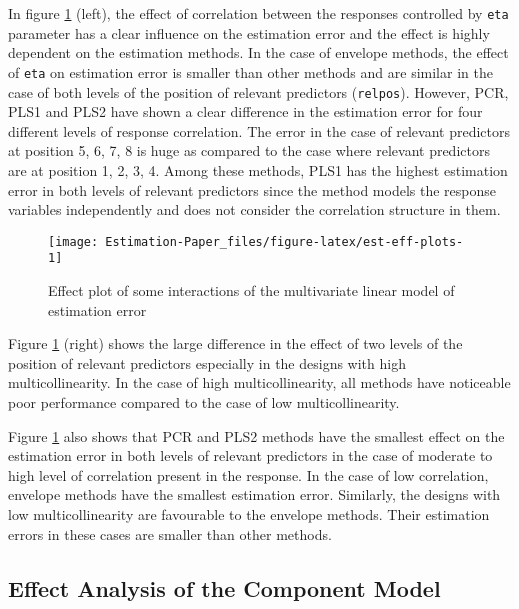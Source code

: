 \documentclass[12pt,3p,authoryear]{elsarticle}
\begin{document}
In figure \ref{fig:est-eff-plots} (left), the effect of correlation
between the responses controlled by \texttt{eta} parameter has a clear
influence on the estimation error and the effect is highly dependent on
the estimation methods. In the case of envelope methods, the effect of
\texttt{eta} on estimation error is smaller than other methods and are
similar in the case of both levels of the position of relevant
predictors (\texttt{relpos}). However, PCR, PLS1 and PLS2 have shown a
clear difference in the estimation error for four different levels of
response correlation. The error in the case of relevant predictors at
position 5, 6, 7, 8 is huge as compared to the case where relevant
predictors are at position 1, 2, 3, 4. Among these methods, PLS1 has the
highest estimation error in both levels of relevant predictors since the
method models the response variables independently and does not consider
the correlation structure in them.




\begin{figure}
\texttt{[image: Estimation-Paper\_files/figure-latex/est-eff-plots-1]} \caption{Effect plot of some interactions of the multivariate
linear model of estimation error}\label{fig:est-eff-plots}
\end{figure}

Figure \ref{fig:est-eff-plots} (right) shows the large difference in the
effect of two levels of the position of relevant predictors especially
in the designs with high multicollinearity. In the case of high
multicollinearity, all methods have noticeable poor performance compared
to the case of low multicollinearity.

Figure \ref{fig:est-eff-plots} also shows that PCR and PLS2 methods have
the smallest effect on the estimation error in both levels of relevant
predictors in the case of moderate to high level of correlation present
in the response. In the case of low correlation, envelope methods have
the smallest estimation error. Similarly, the designs with low
multicollinearity are favourable to the envelope methods. Their
estimation errors in these cases are smaller than other methods.

\subsection{Effect Analysis of the Component
Model}\label{effect-analysis-of-the-component-model}
\end{document}

